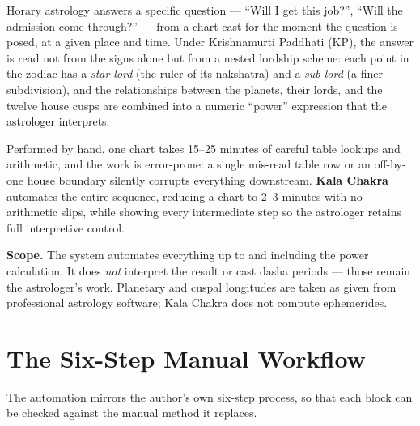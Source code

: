 \documentclass[11pt, a4paper]{article}
\begin{document}
Horary astrology answers a specific question --- ``Will I get this job?'',
``Will the admission come through?'' --- from a chart cast for the moment the
question is posed, at a given place and time. Under Krishnamurti Paddhati
(KP), the answer is read not from the signs alone but from a nested lordship
scheme: each point in the zodiac has a \emph{star lord} (the ruler of its
nakshatra) and a \emph{sub lord} (a finer subdivision), and the relationships
between the planets, their lords, and the twelve house cusps are combined into
a numeric ``power'' expression that the astrologer interprets.

Performed by hand, one chart takes 15--25 minutes of careful table lookups and
arithmetic, and the work is error-prone: a single mis-read table row or an
off-by-one house boundary silently corrupts everything downstream. \textbf{Kala
Chakra} automates the entire sequence, reducing a chart to 2--3 minutes with no
arithmetic slips, while showing every intermediate step so the astrologer
retains full interpretive control.

\begin{notebox}
\textbf{Scope.} The system automates everything up to and including the power
calculation. It does \emph{not} interpret the result or cast dasha periods ---
those remain the astrologer's work. Planetary and cuspal longitudes are taken
as given from professional astrology software; Kala Chakra does not compute
ephemerides.
\end{notebox}

\section{The Six-Step Manual Workflow}

The automation mirrors the author's own six-step process, so that each block
can be checked against the manual method it replaces.
\end{document}
